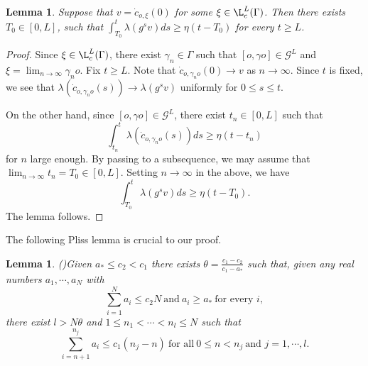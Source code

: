 \documentclass[11pt]{amsart}
\newtheorem{lemma}[theorem]{Lemma}
\theoremstyle{definition}
\newcommand{\GGG}{\mathcal{G}}
\def\c{\gamma}   \def\C{\Gamma}
\begin{document}
\begin{lemma}\label{core}
Suppose that $v=\dot c_{o,\xi}(0)$ for some $\xi\in \L_c^L(\C)$. Then there exists $T_0\in [0,L]$, such that $\int_{T_0}^t\lambda(g^sv)ds \ge \eta(t-T_0)$ for every $t\ge L$. 
\end{lemma}
\begin{proof}
Since $\xi\in \L_c^L(\C)$, there exist $\c_n\in \C$ such that $[o,\c o]\in \GGG^L$ and $\xi=\lim_{n\to \infty}\c_n o$. Fix $t\ge L$. %
Note that $\dot c_{o, \c_no}(0)\to v$ as $n\to \infty$. Since $t$ is fixed, we see that $\lambda(\dot c_{o, \c_no}(s))\to \lambda(g^sv)$ uniformly for $0\le s\le t$. 

On the other hand, since $[o,\c o]\in \GGG^L$, there exist $t_n\in [0, L]$ such that
$$\int_{t_n}^t\lambda(\dot c_{o, \c_no}(s))ds\ge \eta(t-t_n)$$ 
for $n$ large enough. By passing to a subsequence, we may assume that $\lim_{n\to \infty}t_n=T_0\in [0,L]$. Setting $n\to \infty$ in the above, we have 
$$\int_{T_0}^t\lambda(g^sv)ds \ge \eta(t-T_0).$$
The lemma follows.
\end{proof}

The following Pliss lemma \cite{Pliss} is crucial to our proof.
\begin{lemma}(\cite[Lemma 3.5]{LVY})\label{pli}
Given $a_*\le c_2<c_1$ there exists $\theta=\frac{c_1-c_2}{c_1-a_*}$ such that, given any real numbers $a_1, \cdots, a_N$ with
\[\sum_{i=1}^Na_i\le c_2N \ \text{and}\ a_i\ge a_*\ \text{for every\ } i,\]
there exist $l>N\theta$ and $1\le n_1 <\cdots <n_l\le N$ such that
 \[\sum_{i=n+1}^{n_j}a_i\le c_1(n_j-n) \ \text{for all}\ 0\le n<n_j \ \text{and\ }j=1, \cdots ,l.\]
\end{lemma}
\end{document}
